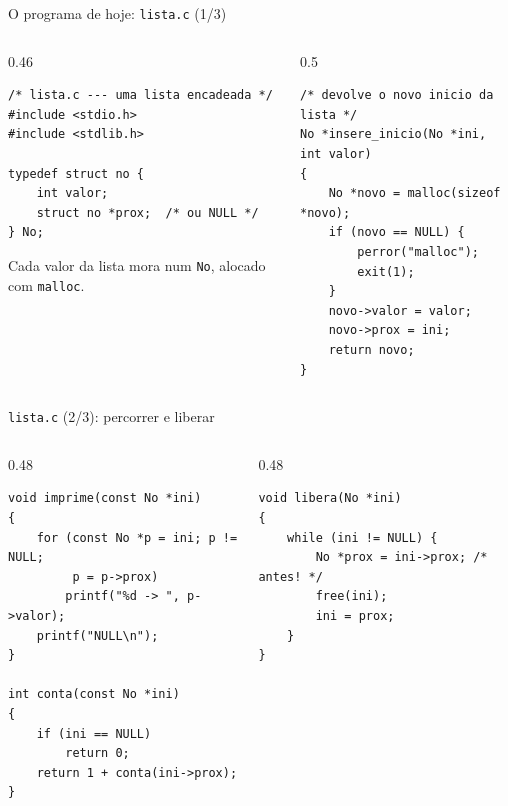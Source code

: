 \documentclass[aspectratio=169]{beamer}
\begin{document}
\begin{frame}[fragile]{O programa de hoje: \texttt{lista.c} (1/3)}
  \begin{columns}[T]
    \begin{column}{0.46\textwidth}
\begin{lstlisting}[style=codC]
/* lista.c --- uma lista encadeada */
#include <stdio.h>
#include <stdlib.h>

typedef struct no {
    int valor;
    struct no *prox;  /* ou NULL */
} No;
\end{lstlisting}
      \small Cada valor da lista mora num \texttt{No}, alocado com
      \texttt{malloc}.
    \end{column}
    \begin{column}{0.5\textwidth}
\begin{lstlisting}[style=codC]
/* devolve o novo inicio da lista */
No *insere_inicio(No *ini, int valor)
{
    No *novo = malloc(sizeof *novo);
    if (novo == NULL) {
        perror("malloc");
        exit(1);
    }
    novo->valor = valor;
    novo->prox = ini;
    return novo;
}
\end{lstlisting}
    \end{column}
  \end{columns}
\end{frame}

\begin{frame}[fragile]{\texttt{lista.c} (2/3): percorrer e liberar}
  \begin{columns}[T]
    \begin{column}{0.48\textwidth}
\begin{lstlisting}[style=codC]
void imprime(const No *ini)
{
    for (const No *p = ini; p != NULL;
         p = p->prox)
        printf("%d -> ", p->valor);
    printf("NULL\n");
}

int conta(const No *ini)
{
    if (ini == NULL)
        return 0;
    return 1 + conta(ini->prox);
}
\end{lstlisting}
    \end{column}
    \begin{column}{0.48\textwidth}
\begin{lstlisting}[style=codC]
void libera(No *ini)
{
    while (ini != NULL) {
        No *prox = ini->prox; /* antes! */
        free(ini);
        ini = prox;
    }
}
\end{lstlisting}
    \end{column}
  \end{columns}
\end{frame}
\end{document}
